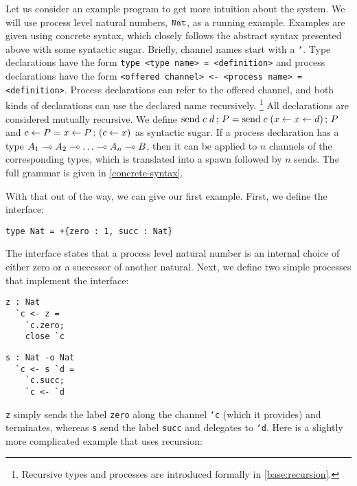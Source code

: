 Let us consider an example program to get more intuition about the system. We will use process level natural numbers, $\mathtt{Nat}$, as a running example. Examples are given using concrete syntax, which closely follows the abstract syntax presented above with some syntactic sugar. Briefly, channel names start with a \texttt{`}. Type declarations have the form \texttt{type <type name> = <definition>} and process declarations have the form \texttt{<offered channel> <- <process name> = <definition>}. Process declarations can refer to the offered channel, and both kinds of declarations can use the declared name recursively.%
\footnote{Recursive types and processes are introduced formally in \cref{base:recursion}.}
All declarations are considered mutually recursive. We define $\mathrm{send}\; c \; {d} \,;\, P = \mathrm{send}\; c \; (x \leftarrow x \leftarrow d) \,;\, P$ and $c \leftarrow P = x \leftarrow P \,;\, (c \leftarrow x)$ as syntactic sugar. If a process declaration has a type $A_1 \multimap A_2 \multimap \ldots \multimap A_n \multimap B$, then it can be applied to $n$ channels of the corresponding types, which is translated into a spawn followed by $n$ sends. The full grammar is given in \cref{concrete-syntax}.

With that out of the way, we can give our first example. First, we define the interface:

\begin{lstlisting}[language=krill, style=custom]
  type Nat = +{zero : 1, succ : Nat}
\end{lstlisting}

The interface states that a process level natural number is an internal choice of either zero or a successor of another natural. Next, we define two simple processes that implement the interface:

\begin{minipage}{.48\textwidth}
\begin{lstlisting}[language=krill, style=custom]
  z : Nat
  `c <- z =
    `c.zero;
    close `c
\end{lstlisting}
\end{minipage}
\hfill
\begin{minipage}{.48\textwidth}
\begin{lstlisting}[language=krill, style=custom]
  s : Nat -o Nat
  `c <- s `d =
    `c.succ;
    `c <- `d
\end{lstlisting}
\end{minipage}

\texttt{z} simply sends the label \texttt{zero} along the channel \texttt{`c} (which it provides) and terminates, whereas \texttt{s} send the label \texttt{succ} and delegates to \texttt{`d}. Here is a slightly more complicated example that uses recursion:

